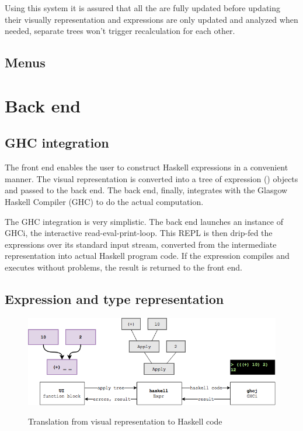 Using this system it is assured that all the  are fully updated before updating their visually representation and expressions are only updated and analyzed when needed, separate trees won't trigger recalculation for each other.

\subsection{Menus}


\section{Back end}

\subsection{GHC integration}

The front end enables the user to construct Haskell expressions in a convenient manner.
The visual representation is converted into a tree of expression () objects and passed to the back end. 
The back end, finally, integrates with the Glasgow Haskell Compiler (\gls{GHC}) to do the actual computation.

The GHC integration is very simplistic.
The back end launches an instance of GHCi, the interactive read-eval-print-loop. 
This \gls{REPL} is then drip-fed the expressions over its standard input stream, converted from the intermediate representation into actual Haskell program code.
If the expression compiles and executes without problems, the result is returned to the front end.

\subsection{Expression and type representation}

\begin{figure}[h]
	\centering
	\includegraphics[scale=0.5]{Images/exprtohaskell}
	\label{fig:classdiagram-expr}
	\caption{Translation from visual representation to Haskell code}
\end{figure}

